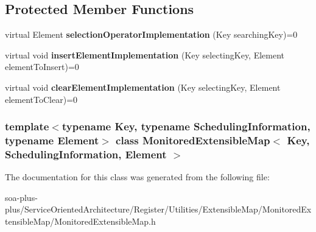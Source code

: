 \subsection*{Protected Member Functions}
\begin{DoxyCompactItemize}
\item 
\hypertarget{class_monitored_extensible_map_afab6d125d7a05c154d0c8abd8e18aba9}{
virtual Element {\bfseries selectionOperatorImplementation} (Key searchingKey)=0}
\label{class_monitored_extensible_map_afab6d125d7a05c154d0c8abd8e18aba9}

\item 
\hypertarget{class_monitored_extensible_map_afe31a2bdd979c0e7bc54f9cbf3647014}{
virtual void {\bfseries insertElementImplementation} (Key selectingKey, Element elementToInsert)=0}
\label{class_monitored_extensible_map_afe31a2bdd979c0e7bc54f9cbf3647014}

\item 
\hypertarget{class_monitored_extensible_map_acdeff93311d5f933b929a36356dfa5fc}{
virtual void {\bfseries clearElementImplementation} (Key selectingKey, Element elementToClear)=0}
\label{class_monitored_extensible_map_acdeff93311d5f933b929a36356dfa5fc}

\end{DoxyCompactItemize}
\subsubsection*{template$<$typename Key, typename SchedulingInformation, typename Element$>$ class MonitoredExtensibleMap$<$ Key, SchedulingInformation, Element $>$}



The documentation for this class was generated from the following file:\begin{DoxyCompactItemize}
\item 
soa-\/plus-\/plus/ServiceOrientedArchitecture/Register/Utilities/ExtensibleMap/MonitoredExtensibleMap/MonitoredExtensibleMap.h\end{DoxyCompactItemize}
